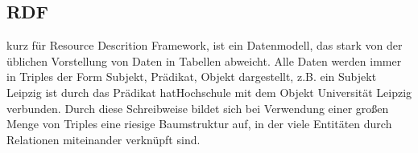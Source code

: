 \subsection{RDF} 
kurz für Resource Descrition Framework, ist ein Datenmodell, das stark von der üblichen Vorstellung von Daten in Tabellen 
abweicht. Alle Daten werden immer in Triples der Form Subjekt, Prädikat, Objekt dargestellt, z.B. ein Subjekt Leipzig ist durch das Prädikat hatHochschule mit dem Objekt Universität Leipzig verbunden. Durch diese Schreibweise bildet sich bei Verwendung einer großen Menge von Triples eine riesige Baumstruktur auf, in der viele Entitäten durch Relationen miteinander verknüpft sind.